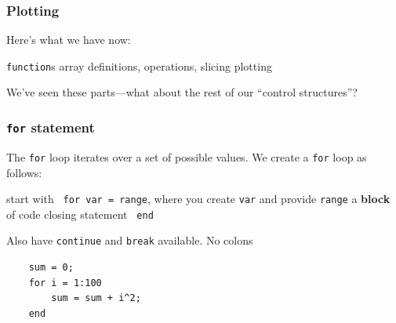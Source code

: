 \documentclass[11pt]{beamer}
\begin{document}
\begin{frame}[fragile]
  \frametitle{Plotting}
  \Enlarge

  \begin{enumerate}
  \myitem  Here's what we have now:
    \begin{enumerate}
    \mysubitem  \texttt{function}s
    \mysubitem  array definitions, operations, slicing
    \mysubitem  plotting
    \end{enumerate}
  \pause
  \myitem  We've seen these parts---what about the rest of our ``control structures''?
  \end{enumerate}
\end{frame}
\fi

\begin{frame}[fragile]
  \frametitle{\texttt{for} statement}
  \Enlarge

  \vspace{3mm}
  \begin{itemize}
  \myitem  The \texttt{for} loop iterates over a set of possible values. 
  \myitem  We create a \texttt{for} loop as follows:
    \begin{itemize}
    \mysubitem  start with \texttt{\color{red} for var = range}, where you create \texttt{var} and provide \texttt{range}
    \mysubitem  a \textbf{block} of code
    \mysubitem  closing statement \texttt{\color{red} end}
    \end{itemize}
  \pause
  \myitem  Also have \texttt{continue} and \texttt{break} available.
  \myitem  No colons
  \end{itemize}
    \begin{verbatim}
    sum = 0;
    for i = 1:100
        sum = sum + i^2;
    end
    \end{verbatim}
\end{frame}
\end{document}
